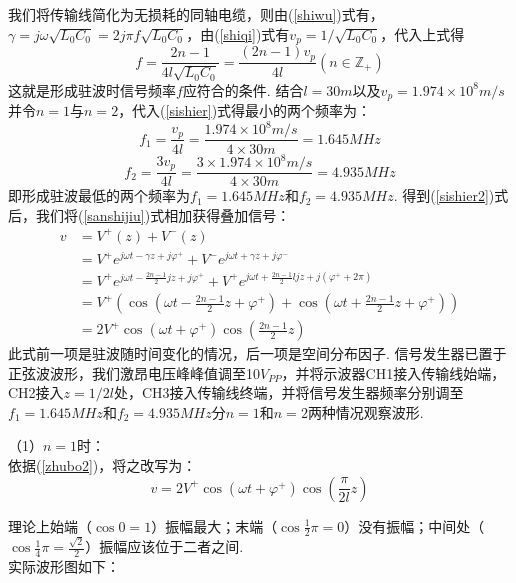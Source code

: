 \documentclass[UTF8]{ctexart}
\begin{document}
我们将传输线简化为无损耗的同轴电缆，则由(\ref{shiwu})式有，$\gamma=j\omega\sqrt{L_0C_0}=2j\pi f\sqrt{L_0C_0}$，由(\ref{shiqi})式有$v_p=1/\sqrt{L_0C_0}$，代入上式得
\begin{equation}f=\frac{2n-1}{4l\sqrt{L_0C_0}}=\frac{(2n-1)v_p}{4l}(n\in \mathbb{Z}_+)\label{sishier2}
\end{equation}
这就是形成驻波时信号频率$f$应符合的条件.
结合$l=30m$以及$v_p=1.974\times 10^8m/s$并令$n=1$与$n=2$，代入(\ref{sishier})式得最小的两个频率为：
\begin{equation}
    f_1=\frac{v_p}{4l}=\frac{1.974\times 10^8m/s}{4\times 30m}=1.645MHz
\end{equation}
\begin{equation}
    f_2=\frac{3v_p}{4l}=\frac{3\times 1.974\times 10^8m/s}{4\times 30m}=4.935MHz
\end{equation}
即形成驻波最低的两个频率为$f_1=1.645MHz$和$f_2=4.935MHz$.
得到(\ref{sishier2})式后，我们将(\ref{sanshijiu})式相加获得叠加信号：
\begin{equation}
    \begin{aligned}
        v&=V^+(z)+V^-(z)\\ 
        &=V^+e^{j\omega t-\gamma z+j\varphi^+}+V^- e^{j\omega t+\gamma z+j\varphi^-}\\
        &=V^+e^{j\omega t-\frac{2n-1}{2}j z+j\varphi^+}+V^+ e^{j\omega t+\frac{2n-1}{2}{l}j z+j(\varphi^++2\pi)}\\
        &=V^+(\cos(\omega t-\frac{2n-1}{2}z+\varphi^+)+\cos(\omega t+\frac{2n-1}{2}z+\varphi^+))\\
        &=2V^+\cos(\omega t+\varphi^+)\cos(\frac{2n-1}{2}z)
    \end{aligned}
    \label{zhubo2}
\end{equation}
此式前一项是驻波随时间变化的情况，后一项是空间分布因子. 信号发生器已置于正弦波波形，我们激昂电压峰峰值调至10$V_{PP}$，并将示波器CH1接入传输线始端，CH2接入$z=1/2l$处，CH3接入传输线终端，并将信号发生器频率分别调至$f_1=1.645MHz$和$f_2=4.935MHz$分$n=1$和$n=2$两种情况观察波形.\par

（1）$n=1$时：\\

依据(\ref{zhubo2})，将之改写为：
\begin{equation}
    v=2V^+\cos(\omega t+\varphi^+)\cos(\frac{\pi}{2l}z)
    \label{n=1'}
\end{equation}\par
理论上始端（$\cos{0}=1$）振幅最大；末端（$\cos{\frac{1}{2}\pi}=0$）没有振幅；中间处（$\cos{\frac{1}{4}\pi}=\frac{\sqrt{2}}{2}$）振幅应该位于二者之间.\\
实际波形图如下：
\end{document}
